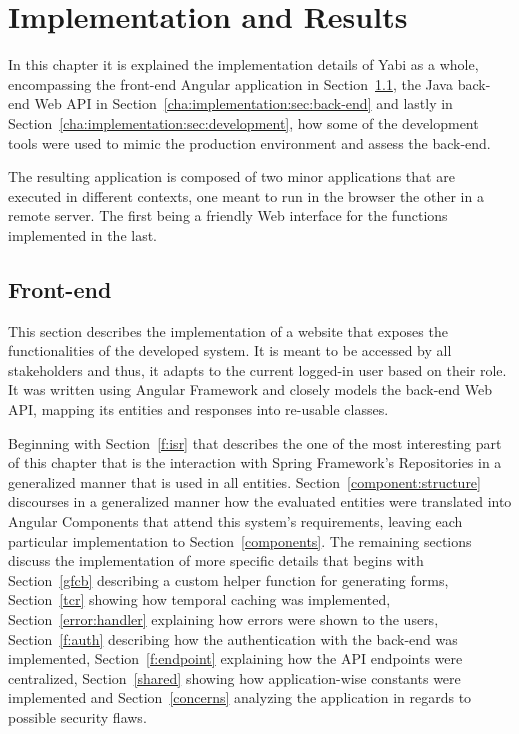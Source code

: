 \chapter{Implementation and Results}\label{cha:implementation}
In this chapter it is explained the implementation details of \gls{Yabi} as a whole, encompassing the front-end Angular application in Section~\ref{cha:implementation:sec:front-end}, the Java back-end Web \gls{API} in Section~\ref{cha:implementation:sec:back-end} and lastly in Section~\ref{cha:implementation:sec:development}, how some of the development tools were used to mimic the production environment and assess the back-end.

The resulting application is composed of two minor applications that are executed in different contexts, one meant to run in the browser the other in a remote server. The first being a friendly Web interface for the functions implemented in the last.

\section{Front-end}\label{cha:implementation:sec:front-end}
This section describes the implementation of a website that exposes the functionalities of the developed system. It is meant to be accessed by all stakeholders and thus, it adapts to the current logged-in user based on their role. It was written using Angular Framework and closely models the back-end Web \gls{API}, mapping its entities and responses into re-usable classes.

Beginning with Section~\ref{f:isr} that describes the one of the most interesting part of this chapter that is the interaction with Spring Framework's Repositories in a generalized manner that is used in all entities. Section~\ref{component:structure} discourses in a generalized manner how the evaluated entities were translated into Angular Components that attend this system's requirements, leaving each particular implementation to Section~\ref{components}. The remaining sections discuss the implementation of more specific details that begins with Section~\ref{gfcb} describing a custom helper function for generating forms, Section~\ref{tcr} showing how temporal caching was implemented, Section~\ref{error:handler} explaining how errors were shown to the users, Section~\ref{f:auth} describing how the authentication with the back-end was implemented, Section~\ref{f:endpoint} explaining how the \gls{API} endpoints were centralized, Section~\ref{shared} showing how application-wise constants were implemented and Section~\ref{concerns} analyzing the application in regards to possible security flaws.

